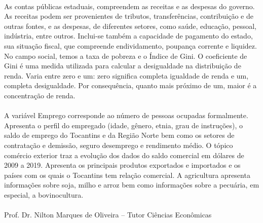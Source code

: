 \begin{center}
\begin{minipage}[t]{.7\linewidth}
		\paragraph{} As contas públicas estaduais, compreendem as receitas e as despesas do governo. As receitas podem ser provenientes de tributos, transferências, contribuição e de outras fontes, e as despesas, de diferentes setores, como saúde, educação, pessoal, indústria, entre outros. Inclui-se também a capacidade de pagamento do estado, sua situação fiscal, que compreende endividamento, poupança corrente e liquidez. No campo social, temos a taxa de pobreza e o Índice de Gini. O coeficiente de Gini é uma medida utilizada para calcular a desigualdade na distribuição de renda. Varia entre zero e um: zero significa completa igualdade de renda e um, completa desigualdade. Por consequência, quanto mais próximo de um, maior é a concentração de renda.

		\paragraph{} A variável Emprego corresponde ao número de pessoas ocupadas formalmente. Apresenta o perfil do empregado (idade, gênero, etnia, grau de instruções), o saldo de emprego do Tocantins e da Região Norte bem como os setores de contratação e demissão, seguro desemprego e rendimento médio. O tópico comércio exterior traz a evolução dos dados do saldo comercial em dólares de 2009 a 2019. Apresenta os principais produtos exportados e importados e os países com os quais    o Tocantins tem relação comercial. A agricultura apresenta informações sobre soja, milho e arroz bem como informações sobre a pecuária, em especial, a bovinocultura.
		\\
		\\
		Prof. Dr. Nilton Marques de Oliveira -- Tutor  Ciências Econômicas
	\end{minipage}
\end{center}
\thispagestyle{empty}